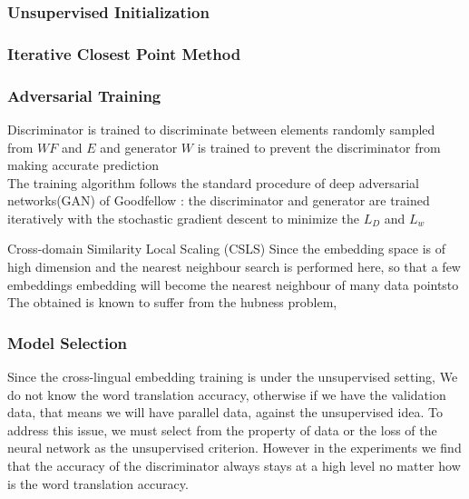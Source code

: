 	
	
	\subsubsection{Unsupervised Initialization}
	\subsubsection{Iterative Closest Point Method}
	\subsubsection{Adversarial Training} 
	Discriminator is trained to discriminate between elements randomly sampled from ${WF}$ and ${E}$ and generator ${W}$ is trained to prevent the discriminator from making accurate prediction\\
	
	The training algorithm follows the standard procedure of deep adversarial networks(GAN) of Goodfellow \cite{bibid}: the discriminator and generator are trained iteratively with the stochastic gradient descent to minimize the ${L_D}$ and ${L_w}$
	
	Cross-domain Similarity Local Scaling (CSLS)
	Since the embedding space is of high dimension and the nearest neighbour search is performed here, so that a few embeddings embedding will become the nearest neighbour of many data pointsto The obtained is known to suffer from the hubness problem,
	
	
	\subsubsection{Model Selection}
	Since the cross-lingual embedding training is under the unsupervised setting, We do not know the word translation accuracy, otherwise if we have the validation data, that means we will have parallel data, against the unsupervised idea. To address this issue, we must select from the property of data or the loss of the neural network as the unsupervised criterion. However in the experiments we find that the accuracy of the discriminator always stays at a high level no matter how is the word translation accuracy. 
	
	